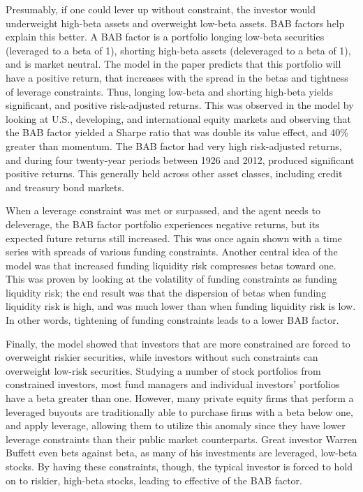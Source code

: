 \documentclass[12pt,twoside]{reedthesis}
\theoremstyle{definition}
\theoremstyle{definition}
\theoremstyle{definition}
\theoremstyle{remark}
\begin{document}
Presumably, if one could lever up without constraint, the investor would
underweight high-beta assets and overweight low-beta assets. BAB factors
help explain this better. A BAB factor is a portfolio longing low-beta
securities (leveraged to a beta of 1), shorting high-beta assets
(deleveraged to a beta of 1), and is market neutral. The model in the
paper predicts that this portfolio will have a positive return, that
increases with the spread in the betas and tightness of leverage
constraints. Thus, longing low-beta and shorting high-beta yields
significant, and positive risk-adjusted returns. This was observed in
the model by looking at U.S., developing, and international equity
markets and observing that the BAB factor yielded a Sharpe ratio that
was double its value effect, and 40\% greater than momentum. The BAB
factor had very high risk-adjusted returns, and during four twenty-year
periods between 1926 and 2012, produced significant positive returns.
This generally held across other asset classes, including credit and
treasury bond markets.

When a leverage constraint was met or surpassed, and the agent needs to
deleverage, the BAB factor portfolio experiences negative returns, but
its expected future returns still increased. This was once again shown
with a time series with spreads of various funding constraints. Another
central idea of the model was that increased funding liquidity risk
compresses betas toward one. This was proven by looking at the
volatility of funding constraints as funding liquidity risk; the end
result was that the dispersion of betas when funding liquidity risk is
high, and was much lower than when funding liquidity risk is low. In
other words, tightening of funding constraints leads to a lower BAB
factor.

Finally, the model showed that investors that are more constrained are
forced to overweight riskier securities, while investors without such
constraints can overweight low-risk securities. Studying a number of
stock portfolios from constrained investors, most fund managers and
individual investors' portfolios have a beta greater than one. However,
many private equity firms that perform a leveraged buyouts are
traditionally able to purchase firms with a beta below one, and apply
leverage, allowing them to utilize this anomaly since they have lower
leverage constraints than their public market counterparts. Great
investor Warren Buffett even bets against beta, as many of his
investments are leveraged, low-beta stocks. By having these constraints,
though, the typical investor is forced to hold on to riskier, high-beta
stocks, leading to effective of the BAB factor.
\end{document}

